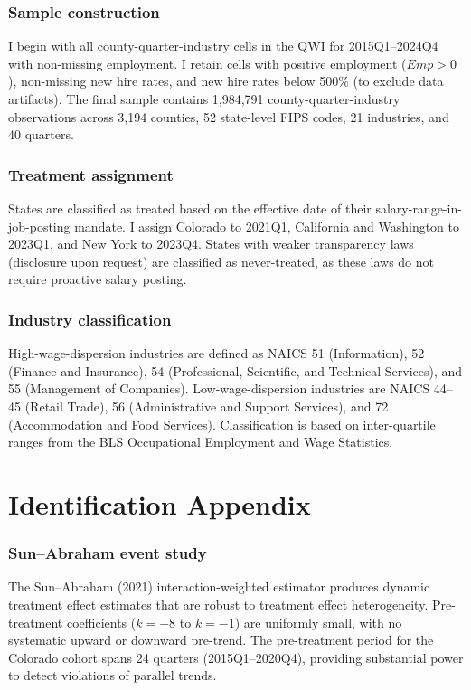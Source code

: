 \documentclass[12pt]{article}
\begin{document}
\subsubsection*{Sample construction} I begin with all county-quarter-industry cells in the QWI for 2015Q1--2024Q4 with non-missing employment. I retain cells with positive employment ($Emp > 0$), non-missing new hire rates, and new hire rates below 500\% (to exclude data artifacts). The final sample contains 1,984,791 county-quarter-industry observations across 3,194 counties, 52 state-level FIPS codes, 21 industries, and 40 quarters.

\subsubsection*{Treatment assignment} States are classified as treated based on the effective date of their salary-range-in-job-posting mandate. I assign Colorado to 2021Q1, California and Washington to 2023Q1, and New York to 2023Q4. States with weaker transparency laws (disclosure upon request) are classified as never-treated, as these laws do not require proactive salary posting.

\subsubsection*{Industry classification} High-wage-dispersion industries are defined as NAICS 51 (Information), 52 (Finance and Insurance), 54 (Professional, Scientific, and Technical Services), and 55 (Management of Companies). Low-wage-dispersion industries are NAICS 44--45 (Retail Trade), 56 (Administrative and Support Services), and 72 (Accommodation and Food Services). Classification is based on inter-quartile ranges from the BLS Occupational Employment and Wage Statistics.

\section{Identification Appendix}

\subsubsection*{Sun--Abraham event study} The Sun--Abraham (2021) interaction-weighted estimator produces dynamic treatment effect estimates that are robust to treatment effect heterogeneity. Pre-treatment coefficients ($k = -8$ to $k = -1$) are uniformly small, with no systematic upward or downward pre-trend. The pre-treatment period for the Colorado cohort spans 24 quarters (2015Q1--2020Q4), providing substantial power to detect violations of parallel trends.
\end{document}
